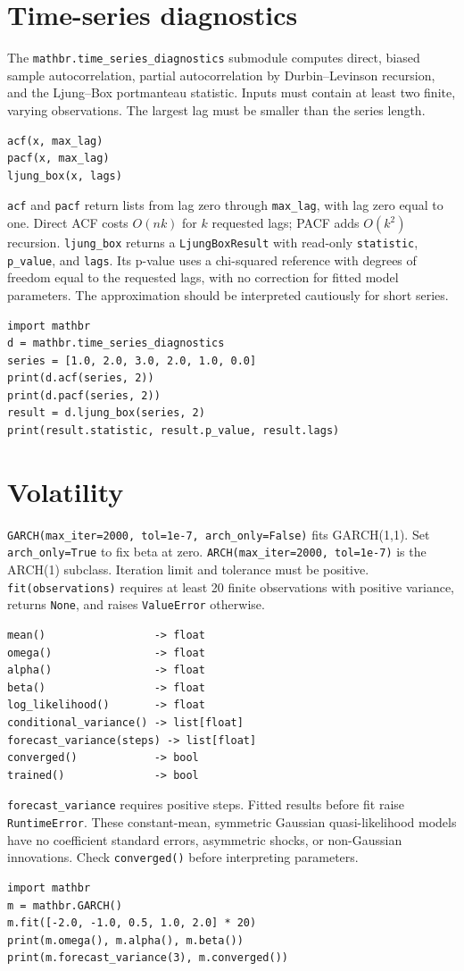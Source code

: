 \documentclass[11pt,a4paper]{article}
\begin{document}
\section{Time-series diagnostics}
The \verb|mathbr.time_series_diagnostics| submodule computes direct, biased sample autocorrelation, partial autocorrelation by Durbin--Levinson recursion, and the Ljung--Box portmanteau statistic. Inputs must contain at least two finite, varying observations. The largest lag must be smaller than the series length.
\begin{verbatim}
acf(x, max_lag)
pacf(x, max_lag)
ljung_box(x, lags)
\end{verbatim}
\verb|acf| and \verb|pacf| return lists from lag zero through \verb|max_lag|, with lag zero equal to one. Direct ACF costs $O(nk)$ for $k$ requested lags; PACF adds $O(k^2)$ recursion. \verb|ljung_box| returns a \verb|LjungBoxResult| with read-only \verb|statistic|, \verb|p_value|, and \verb|lags|. Its p-value uses a chi-squared reference with degrees of freedom equal to the requested lags, with no correction for fitted model parameters. The approximation should be interpreted cautiously for short series.
\begin{verbatim}
import mathbr
d = mathbr.time_series_diagnostics
series = [1.0, 2.0, 3.0, 2.0, 1.0, 0.0]
print(d.acf(series, 2))
print(d.pacf(series, 2))
result = d.ljung_box(series, 2)
print(result.statistic, result.p_value, result.lags)
\end{verbatim}

\section{Volatility}
\verb|GARCH(max_iter=2000, tol=1e-7, arch_only=False)| fits GARCH(1,1). Set \verb|arch_only=True| to fix beta at zero. \verb|ARCH(max_iter=2000, tol=1e-7)| is the ARCH(1) subclass. Iteration limit and tolerance must be positive. \verb|fit(observations)| requires at least 20 finite observations with positive variance, returns \verb|None|, and raises \verb|ValueError| otherwise.
\begin{verbatim}
mean()                 -> float
omega()                -> float
alpha()                -> float
beta()                 -> float
log_likelihood()       -> float
conditional_variance() -> list[float]
forecast_variance(steps) -> list[float]
converged()            -> bool
trained()              -> bool
\end{verbatim}
\verb|forecast_variance| requires positive steps. Fitted results before fit raise \verb|RuntimeError|. These constant-mean, symmetric Gaussian quasi-likelihood models have no coefficient standard errors, asymmetric shocks, or non-Gaussian innovations. Check \verb|converged()| before interpreting parameters.
\begin{verbatim}
import mathbr
m = mathbr.GARCH()
m.fit([-2.0, -1.0, 0.5, 1.0, 2.0] * 20)
print(m.omega(), m.alpha(), m.beta())
print(m.forecast_variance(3), m.converged())
\end{verbatim}
\end{document}
